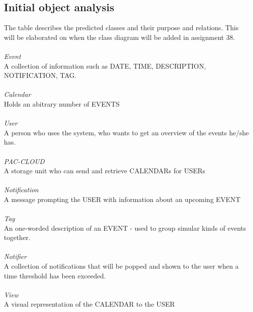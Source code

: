 \subsection{Initial object analysis}
The table describes the predicted classes and their purpose and relations. This will be elaborated on when the class diagram will be added in assignment 38.
\\
\HRule \\[0.4cm]
\emph{Event}\\
A collection of information such as DATE, TIME, DESCRIPTION, NOTIFICATION, TAG.\\
\HRule \\[0.4cm]
\emph{Calendar}\\
Holds an abitrary number of EVENTS\\
\HRule \\[0.4cm]
\emph{User}\\
A person who uses the system, who wants to get an overview of the events he/she has.\\
\HRule \\[0.4cm]
\emph{PAC-CLOUD}\\
A storage unit who can send and retrieve CALENDARs for USERs\\
\HRule \\[0.4cm]
\emph{Notification}\\
A message prompting the USER with information about an upcoming EVENT\\
\HRule \\[0.4cm]
\emph{Tag}\\
An one-worded description of an EVENT - used to group simular kinds of events together.\\
\HRule \\[0.4cm]
\emph{Notifier}\\
A collection of notifications that will be popped and shown to the user when a time threshold has been exceeded.\\
\HRule \\[0.4cm]
\emph{View}\\
A visual representation of the CALENDAR to the USER\\
\HRule \\[0.4cm]

